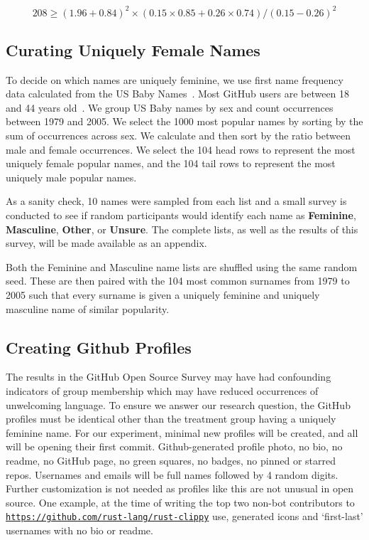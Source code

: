 \documentclass[journal,12pt,onecolumn,]{IEEEtran}
\begin{document}
\begin{equation} \label{numspluggedin}
    208 \ge (1.96 + 0.84)^2 \times (0.15 \times 0.85 + 0.26 \times 0.74) / (0.15 - 0.26)^2
\end{equation}

\subsection{Curating Uniquely Female Names}

To decide on which names are uniquely feminine, we use first name frequency data calculated from the US Baby Names~\cite{names}.
Most GitHub users are between 18 and 44 years old~\cite{geiger17}.
We group US Baby names by sex and count occurrences between 1979 and 2005.
We select the 1000 most popular names by sorting by the sum of occurrences across sex.
We calculate and then sort by the ratio between male and female occurrences.
We select the 104 head rows to represent the most uniquely female popular names, and the 104 tail rows to represent the most uniquely male popular names.

As a sanity check, 10 names were sampled from each list and a small survey is conducted to see if random participants would identify each name as \textbf{Feminine}, \textbf{Masculine}, \textbf{Other}, or \textbf{Unsure}.
The complete lists, as well as the results of this survey, will be made available as an appendix.

Both the Feminine and Masculine name lists are shuffled using the same random seed.
These are then paired with the 104 most common surnames from 1979 to 2005 such that every surname is given a uniquely feminine and uniquely masculine name of similar popularity.

\subsection{Creating Github Profiles}

The results in the GitHub Open Source Survey may have had confounding indicators of group membership which may have reduced occurrences of unwelcoming language.
To ensure we answer our research question, the GitHub profiles must be identical other than the treatment group having a uniquely feminine name.
For our experiment, minimal new profiles will be created, and all will be opening their first commit.
Github-generated profile photo, no bio, no readme, no GitHub page, no green squares, no badges, no pinned or starred repos.
Usernames and emails will be full names followed by 4 random digits.
Further customization is not needed as profiles like this are not unusual in open source.
One example, at the time of writing the top two non-bot contributors to \href{https://github.com/rust-lang/rust-clippy}{\texttt{https://github.com/rust-lang/rust-clippy}} use, generated icons and `first-last' usernames with no bio or readme.
\end{document}
